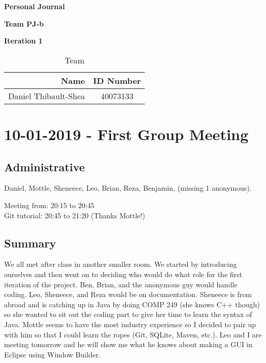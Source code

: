 \documentclass[12pt]{article}
\begin{document}
	
	\vspace*{0.5in}
	\centerline{\bf\Large Personal Journal}
	
	\vspace*{0.5in}
	\centerline{\bf\Large Team PJ-b}
	\vspace*{0.25in}
	\centerline{\bf\Large Iteration 1}
	
	
	\vspace*{1.5in}
	\begin{table}[htbp]
		\caption{Team}
		\begin{center}
			\begin{tabular}{|r | c|}
				\hline
				Name & ID Number \\
				\hline\hline
				Daniel Thibault-Shea & 40073133 \\
				\hline
			\end{tabular}
		\end{center}
	\end{table}
	
	\clearpage
	
	\section{10-01-2019 - First Group Meeting}
	
	\subsection{Administrative}
	Daniel, Mottle, Sheneece, Leo, Brian, Reza, Benjamin, (missing 1 anonymous).
	
	Meeting from: 20:15 to 20:45\\
	Git tutorial: 20:45 to 21:20 (Thanks Mottle!)
	
	\subsection{Summary}
	We all met after class in another smaller room. We started by introducing ourselves and then went on to deciding who would do what role for the first iteration of the project. Ben, Brian, and the anonymous guy would handle coding. Leo, Sheneece, and Reza would be on documentation. Sheneece is from abroad and is catching up in Java by doing COMP 249 (she knows C++ though) so she wanted to sit out the coding part to give her time to learn the syntax of Java. Mottle seems to have the most industry experience so I decided to pair up with him so that I could learn the ropes (Git, SQLite, Maven, etc.). Leo and I are meeting tomorrow and he will show me what he knows about making a GUI in Eclipse using Window Builder.
	
\end{document}
